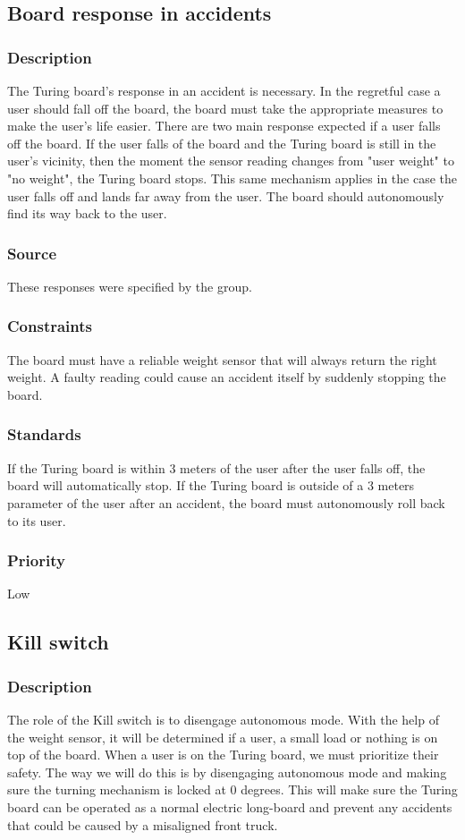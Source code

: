 \subsection{Board response in accidents}
\subsubsection{Description}
The Turing board's response in an accident is necessary. In the regretful case a user should fall off the board, the board must take the appropriate measures to make the user's life easier. There are two main response expected if a user falls off the board. If the user falls of the board and the Turing board is still in the user's vicinity, then the moment the sensor reading changes from "user weight" to "no weight", the Turing board stops. This same mechanism applies in the case the user falls off and lands far away from the user. The board should autonomously find its way back to the user.
\subsubsection{Source}
These responses were specified by the group.
\subsubsection{Constraints}
The board must have a reliable weight sensor that will always return the right weight. A faulty reading could cause an accident itself by suddenly stopping the board.
\subsubsection{Standards}
If the Turing board is within 3 meters of the user after the user falls off, the board will automatically stop.\hfill \break
If the Turing board is outside of a 3 meters parameter of the user after an accident, the board must autonomously roll back to its user. 
\subsubsection{Priority}
Low
\subsection{Kill switch}
\subsubsection{Description}
The role of the Kill switch is to disengage autonomous mode. With the help of the weight sensor, it will be determined if a user, a small load or nothing is on top of the board. When a user is on the Turing board, we must prioritize their safety. The way we will do this is by disengaging autonomous mode and making sure the turning mechanism is locked at 0 degrees. This will make sure the Turing board can be operated as a normal electric long-board and prevent any accidents that could be caused by a misaligned front truck. 
